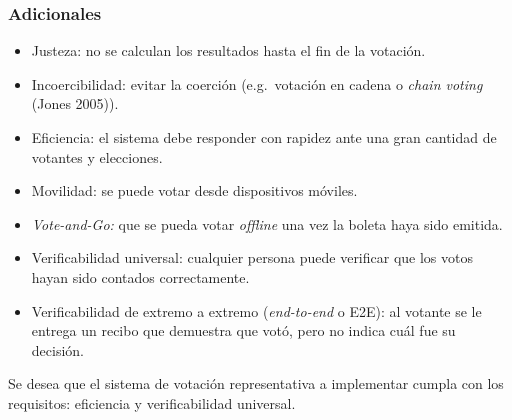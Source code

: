 \subsubsection{Adicionales}

\begin{itemize}
\item
  Justeza: no se calculan los resultados hasta el fin de la votación.
\item
  Incoercibilidad: evitar la coerción (e.g.~votación en cadena o
  \emph{chain voting} (Jones 2005)).
\item
  Eficiencia: el sistema debe responder con rapidez ante una gran
  cantidad de votantes y elecciones.
\item
  Movilidad: se puede votar desde dispositivos móviles.
\item
  \emph{Vote-and-Go:} que se pueda votar \emph{offline} una vez la
  boleta haya sido emitida.
\item
  Verificabilidad universal: cualquier persona puede verificar que los
  votos hayan sido contados correctamente.
\item
  Verificabilidad de extremo a extremo (\emph{end-to-end} o E2E): al
  votante se le entrega un recibo que demuestra que votó, pero no indica
  cuál fue su decisión.
\end{itemize}

Se desea que el sistema de votaci\'on representativa a implementar cumpla con los requisitos: eficiencia y verificabilidad universal.